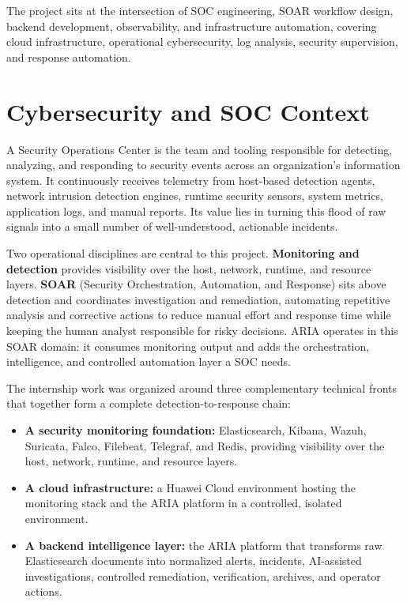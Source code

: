 The project sits at the intersection of SOC engineering, SOAR workflow design, backend development, observability, and infrastructure automation, covering cloud infrastructure, operational cybersecurity, log analysis, security supervision, and response automation.

\section{Cybersecurity and SOC Context}

A Security Operations Center is the team and tooling responsible for detecting, analyzing, and responding to security events across an organization's information system. It continuously receives telemetry from host-based detection agents, network intrusion detection engines, runtime security sensors, system metrics, application logs, and manual reports. Its value lies in turning this flood of raw signals into a small number of well-understood, actionable incidents.

Two operational disciplines are central to this project. \textbf{Monitoring and detection} provides visibility over the host, network, runtime, and resource layers. \textbf{SOAR} (Security Orchestration, Automation, and Response) sits above detection and coordinates investigation and remediation, automating repetitive analysis and corrective actions to reduce manual effort and response time while keeping the human analyst responsible for risky decisions. ARIA operates in this SOAR domain: it consumes monitoring output and adds the orchestration, intelligence, and controlled automation layer a SOC needs.

The internship work was organized around three complementary technical fronts that together form a complete detection-to-response chain:

\begin{itemize}[leftmargin=1cm]
\item \textbf{A security monitoring foundation:} Elasticsearch, Kibana, Wazuh, Suricata, Falco, Filebeat, Telegraf, and Redis, providing visibility over the host, network, runtime, and resource layers.
\item \textbf{A cloud infrastructure:} a Huawei Cloud environment hosting the monitoring stack and the ARIA platform in a controlled, isolated environment.
\item \textbf{A backend intelligence layer:} the ARIA platform that transforms raw Elasticsearch documents into normalized alerts, incidents, AI-assisted investigations, controlled remediation, verification, archives, and operator actions.
\end{itemize}


